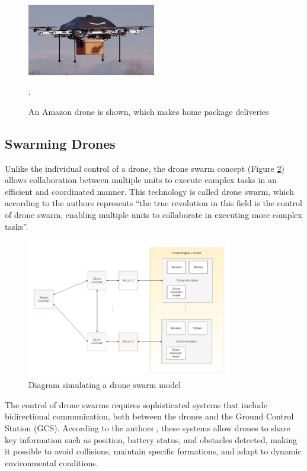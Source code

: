 \begin{figure}[H]
    \centering
    \includegraphics[width=0.5\textwidth]{pictures/drone_aplication_2.jpg}
    \caption{An Amazon drone is shown, which makes home package deliveries \cite{aplications_drones}}.
    \label{fig:drone_applications_2}
\end{figure}

\subsection{Swarming Drones}
Unlike the individual control of a drone, the drone swarm concept (Figure \ref{fig:swarming_drones}) allows collaboration between multiple units to execute complex tasks in an efficient and coordinated manner. This technology is called drone swarm, which according to the authors \cite{swarm_industrial} represents “the true revolution in this field is the control of drone swarm, enabling multiple units to collaborate in executing more complex tasks”. 

\begin{figure}[H]
    \centering
    \includegraphics[width=0.8\textwidth]{pictures/swarm_diagram.png}
    \caption{Diagram simulating a drone swarm model}
    \label{fig:swarming_drones}
\end{figure}

The control of drone swarms requires sophisticated systems that include bidirectional communication, both between the drones and the Ground Control Station (GCS). According to the authors \cite{swarming_drones}, these systems allow drones to share key information such as position, battery status, and obstacles detected, making it possible to avoid collisions, maintain specific formations, and adapt to dynamic environmental conditions.

